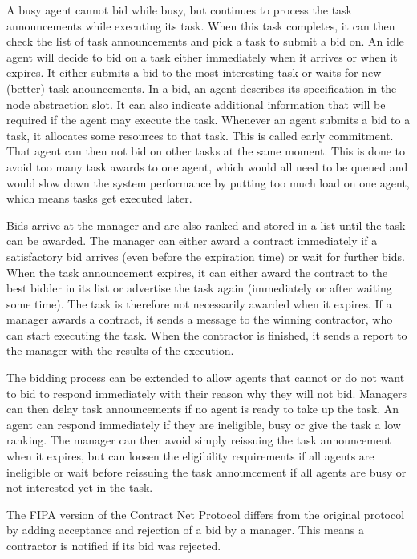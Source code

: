 \documentclass[10pt,a4paper]{article}
\begin{document}
A busy agent cannot bid while busy, but continues to process the task announcements while executing its task. When this task completes, it can then check the list of task announcements and pick a task to submit a bid on. An idle agent will decide to bid on a task either immediately when it arrives or when it expires. It either submits a bid to the most interesting task or waits for new (better) task anouncements. In a bid, an agent describes its specification in the node abstraction slot. It can also indicate additional information that will be required if the agent may execute the task. Whenever an agent submits a bid to a task, it allocates some resources to that task. This is called early commitment. That agent can then not bid on other tasks at the same moment. This is done to avoid too many task awards to one agent, which would all need to be queued and would slow down the system performance by putting too much load on one agent, which means tasks get executed later.

Bids arrive at the manager and are also ranked and stored in a list until the task can be awarded. The manager can either award a contract immediately if a satisfactory bid arrives (even before the expiration time) or wait for further bids. When the task announcement expires, it can either award the contract to the best bidder in its list or advertise the task again (immediately or after waiting some time). The task is therefore not necessarily awarded when it expires. If a manager awards a contract, it sends a message to the winning contractor, who can start executing the task. When the contractor is finished, it sends a report to the manager with the results of the execution.

The bidding process can be extended to allow agents that cannot or do not want to bid to respond immediately with their reason why they will not bid. Managers can then delay task announcements if no agent is ready to take up the task. An agent can respond immediately if they are ineligible, busy or give the task a low ranking. The manager can then avoid simply reissuing the task announcement when it expires, but can loosen the eligibility requirements if all agents are ineligible or wait before reissuing the task announcement if all agents are busy or not interested yet in the task.

The FIPA version of the Contract Net Protocol \cite{CNETStandard} differs from the original protocol by adding acceptance and rejection of a bid by a manager. This means a contractor is notified if its bid was rejected.
\end{document}
